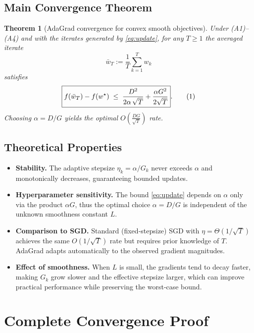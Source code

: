 \documentclass{article}
\newtheorem{theorem}{Theorem}
\begin{document}
\subsection*{Main Convergence Theorem}
\begin{theorem}[AdaGrad convergence for convex smooth objectives]\label{thm:main}
Under (A1)–(A4) and with the iterates generated by \eqref{eq:update},
for any $T\ge 1$ the averaged iterate
\[
\bar w_T:=\frac1T\sum_{k=1}^{T}w_k
\]
satisfies
\[
\boxed{%
f(\bar w_T)-f(w^\star)\;\le\;
\frac{D^2}{2\alpha\,\sqrt{T}}+\frac{\alpha G^2}{2\sqrt{T}} }.
\tag{1}
\]
Choosing $\alpha=D/G$ yields the optimal $O\!\left(\frac{DG}{\sqrt{T}}\right)$ rate.
\end{theorem}

\subsection*{Theoretical Properties}
\begin{itemize}
\item \textbf{Stability.} The adaptive stepsize $\eta_k=\alpha/G_k$ never exceeds $\alpha$ and monotonically decreases, guaranteeing bounded updates.
\item \textbf{Hyperparameter sensitivity.} The bound \eqref{eq:update} depends on $\alpha$ only via the product $\alpha G$, thus the optimal choice $\alpha=D/G$ is independent of the unknown smoothness constant $L$.
\item \textbf{Comparison to SGD.} Standard (fixed‑stepsize) SGD with $\eta=\Theta(1/\sqrt{T})$ achieves the same $O(1/\sqrt{T})$ rate but requires prior knowledge of $T$. AdaGrad adapts automatically to the observed gradient magnitudes.
\item \textbf{Effect of smoothness.} When $L$ is small, the gradients tend to decay faster, making $G_k$ grow slower and the effective stepsize larger, which can improve practical performance while preserving the worst‑case bound.
\end{itemize}

\section*{Complete Convergence Proof}
\end{document}
